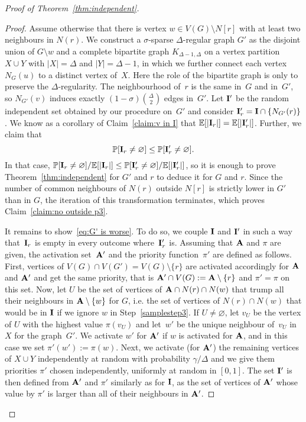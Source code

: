 \begin{proof}[Proof of Theorem~\ref{thm:independent}]
\begin{proof}
Assume otherwise that there is vertex $w\in V(G)\setminus N[r]$
with at least two neighbours in $N(r)$.
We construct a $\sigma$-sparse $\Delta$-regular graph $G'$ as the disjoint union
of $G\setminus w$ and a complete bipartite graph $K_{\Delta-1,\Delta}$ on a vertex partition $X\cup Y$ with $|X|=\Delta$ and $|Y|=\Delta-1$,
in which we further connect each vertex $N_G(u)$ to a distinct vertex of~$X$.
Here the role of the bipartite graph is only to preserve the $\Delta$-regularity.
The neighbourhood of~$r$ is the same in~$G$ and in~$G'$, so $N_{G'}(v)$ induces
exactly $(1-\sigma)\binom{\Delta}{2}$ edges in~$G'$.
Let ${\bf{I}}'$ be the random independent set obtained by our procedure on~$G'$
and consider ${\bf{I}}_r'={\bf{I}} \cap\{N_{G'}(r)\}$.
We know as a corollary of Claim~\ref{claim:v in I}
that $\mathbb{E}[|{\bf{I}}_r|]=\mathbb{E}[|{\bf{I}}_r'|]$.
Further, we claim that
\begin{equation}\label{eq:G' is worse}
\mathbb{P}[{\bf{I}}_r\neq\varnothing]\leq\mathbb{P}[{\bf{I}}_r'\neq\varnothing].
\end{equation}
In that case,
$\mathbb{P}[{\bf{I}}_r\neq\varnothing]/\mathbb{E}[|{\bf{I}}_r|]\leq \mathbb{P}[{\bf{I}}_r'\neq\varnothing]/\mathbb{E}[|{\bf{I}}_r'|]$,
so it is enough to prove Theorem~\ref{thm:independent} for $G'$ and $r$ to deduce it for $G$ and $r$.
Since the number of common neighbours of $N(r)$ outside $N[r]$ is strictly
lower in $G'$ than in $G$,
the iteration of this transformation terminates, which proves Claim~\ref{claim:no outside p3}.

It remains to show~\eqref{eq:G' is worse}.
To do so, we couple ${\bf{I}}$ and ${\bf{I}}'$
in such a way that~${\bf{I}}_r$ is empty in every outcome where~${\bf{I}}_r'$ is.
Assuming that ${\bf{A}}$ and $\pi$ are given, the activation set~${\bf{A}}'$
and the priority function~$\pi'$ are defined as follows.
First, vertices of $V(G)\cap V(G')=V(G)\setminus\{r\}$ are activated accordingly for ${\bf{A}}$
and ${\bf{A}}'$ and get the same priority, that is
${\bf{A}}'\cap V(G):= {\bf{A}}\setminus\{r\}$ and $\pi'=\pi$ on this set.
Now, let $U$ be the set of vertices of ${\bf{A}}\cap N(r)\cap N(w)$
that trump all their neighbours in ${\bf{A}}\setminus \{w\}$ for $G$,
i.e. the set of vertices of $N(r)\cap N(w)$ that would be in ${\bf{I}}$ if we ignore $w$
in Step~\ref{samplestep3}.
If $U\neq\varnothing$,
let $v_U$ be the vertex of $U$ with the highest value $\pi(v_U)$
and let~$w'$ be the unique neighbour of~$v_U$ in~$X$ for the graph~$G'$.
We activate $w'$ for ${\bf{A}}'$ if $w$ is activated for ${\bf{A}}$,
and in this case we set $\pi'(w'):=\pi(w)$.
Next, we activate (for ${\bf{A}}'$) the remaining vertices of $X\cup Y$ independently at random with
probability $\gamma/\Delta$ and we give them priorities $\pi'$ chosen independently,
uniformly at random in $[0,1]$.
The set ${\bf{I}}'$ is then defined from ${\bf{A}}'$ and $\pi'$ similarly as for ${\bf{I}}$,
as the set of vertices of ${\bf{A}}'$ whose value by $\pi'$ is larger than all of their neighbours
in ${\bf{A}}'$.


\end{proof}
\end{proof}
